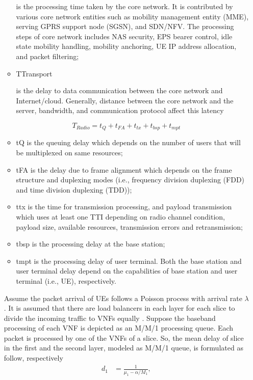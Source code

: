 \documentclass[conference]{IEEEtran}
\begin{document}
\begin{enumerate}
\begin{itemize}
 is the processing time taken by the core network.
It is contributed by various core network entities such
as mobility management entity (MME), serving GPRS
support node (SGSN), and SDN/NFV. The processing
steps of core network includes NAS security, EPS bearer
control, idle state mobility handling, mobility anchoring,
UE IP address allocation, and packet filtering;
\item TTransport

 is the delay to data communication between
the core network and Internet/cloud. Generally, distance
between the core network and the server, bandwidth, and
communication protocol affect this latency
\end{itemize}
\begin{equation}
T_{Radio} = t_{Q} + t_{FA} + t_{tx} + t_{bsp} + t_{mpt}
\end{equation}
\begin{itemize}
\item tQ is the queuing delay which depends on the number of
users that will be multiplexed on same resources;
\item tFA is the delay due to frame alignment which depends on
the frame structure and duplexing modes (i.e., frequency
division duplexing (FDD) and time division duplexing
(TDD));
\item ttx is the time for transmission processing, and payload
transmission which uses at least one TTI depending on
radio channel condition, payload size, available resources,
transmission errors and retransmission;
\item tbsp is the processing delay at the base station;
\item  tmpt is the processing delay of user terminal. Both
the base station and user terminal delay depend on the
capabilities of base station and user terminal (i.e., UE),
respectively.
\end{itemize}
Assume the packet arrival of UEs follows a Poisson process with arrival rate $\lambda$.
It is assumed that there are load balancers in each layer for each slice to divide the incoming traffic to VNFs equally \cite{frdl,luong2018novel,luong2018novel1}.
Suppose the baseband processing of each VNF is depicted as an M/M/1 processing queue.
Each packet is processed by one of the VNFs of a slice. So, the mean delay of  slice in the first and the second layer, modeled as M/M/1 queue, is formulated as follow, respectively
\begin{equation}
\begin{split}
d_{1} &= \frac{1}{\mu_1 - \alpha/{M_{1}}},\\

\end{split}
\end{equation}
\end{enumerate}
\end{document}
